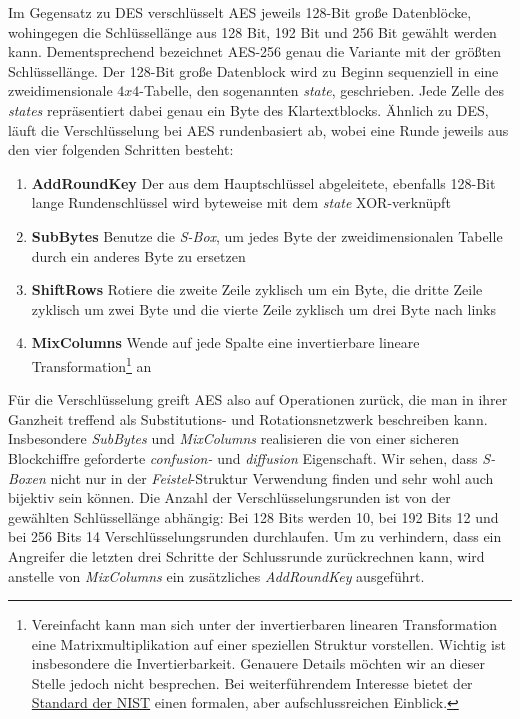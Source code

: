 Im Gegensatz zu DES verschlüsselt AES jeweils 128-Bit große Datenblöcke, wohingegen die Schlüssellänge aus 128 Bit, 192 Bit und 256 Bit gewählt werden kann. Dementsprechend bezeichnet AES-256 genau die Variante mit der größten Schlüssellänge. Der 128-Bit große Datenblock wird zu Beginn sequenziell in eine zweidimensionale $4x4$-Tabelle, den sogenannten \textit{state}, geschrieben. Jede Zelle des \textit{states} repräsentiert dabei genau ein Byte des Klartextblocks. Ähnlich zu DES, läuft die Verschlüsselung bei AES rundenbasiert ab, wobei eine Runde jeweils aus den vier folgenden Schritten besteht:

\begin{enumerate}
	\small
	\item \textbf{AddRoundKey} Der aus dem Hauptschlüssel abgeleitete, ebenfalls 128-Bit lange Rundenschlüssel wird byteweise mit dem \textit{state} XOR-verknüpft
	\item \textbf{SubBytes} Benutze die \textit{S-Box}, um jedes Byte der zweidimensionalen Tabelle durch ein anderes Byte zu ersetzen
	\item \textbf{ShiftRows} Rotiere die zweite Zeile zyklisch um ein Byte, die dritte Zeile zyklisch um zwei Byte und die vierte Zeile zyklisch um drei Byte nach links
	\item \textbf{MixColumns} Wende auf jede Spalte eine invertierbare lineare Transformation\footnote{Vereinfacht kann man sich unter der invertierbaren linearen Transformation eine Matrixmultiplikation auf einer speziellen Struktur vorstellen. Wichtig ist insbesondere die Invertierbarkeit. Genauere Details möchten wir an dieser Stelle jedoch nicht besprechen. Bei weiterführendem Interesse bietet der \href{http://csrc.nist.gov/publications/fips/fips197/fips-197.pdf}{Standard der NIST} einen formalen, aber aufschlussreichen Einblick.} an
\end{enumerate}

Für die Verschlüsselung greift AES also auf Operationen zurück, die man in ihrer Ganzheit treffend als Substitutions- und Rotationsnetzwerk beschreiben kann. Insbesondere \textit{SubBytes} und \textit{MixColumns} realisieren die von einer sicheren Blockchiffre geforderte \textit{confusion-} und \textit{diffusion} Eigenschaft. Wir sehen, dass \textit{S-Boxen} nicht nur in der \textit{Feistel}-Struktur Verwendung finden und sehr wohl auch bijektiv sein können.
Die Anzahl der Verschlüsselungsrunden ist von der gewählten Schlüssellänge abhängig: Bei 128 Bits werden 10, bei 192 Bits 12 und bei 256 Bits 14 Verschlüsselungsrunden durchlaufen. Um zu verhindern, dass ein Angreifer die letzten drei Schritte der Schlussrunde zurückrechnen kann, wird anstelle von \textit{MixColumns} ein zusätzliches \textit{AddRoundKey} ausgeführt.

